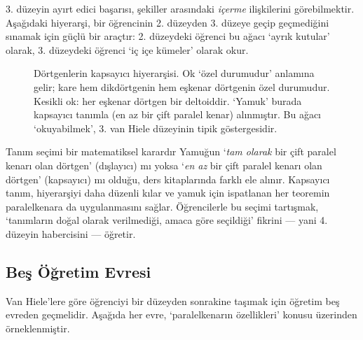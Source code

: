 3. düzeyin ayırt edici başarısı, şekiller arasındaki \emph{içerme} ilişkilerini görebilmektir. Aşağıdaki hiyerarşi, bir öğrencinin 2. düzeyden 3. düzeye geçip geçmediğini sınamak için güçlü bir araçtır: 2. düzeydeki öğrenci bu ağacı ‘ayrık kutular’ olarak, 3. düzeydeki öğrenci ‘iç içe kümeler’ olarak okur.

\begin{figure}[h]
\centering
{}
\caption{Dörtgenlerin kapsayıcı hiyerarşisi. Ok ‘özel durumudur’ anlamına gelir; kare hem dikdörtgenin hem eşkenar dörtgenin özel durumudur. Kesikli ok: her eşkenar dörtgen bir deltoiddir. ‘Yamuk’ burada kapsayıcı tanımla (en az bir çift paralel kenar) alınmıştır. Bu ağacı ‘okuyabilmek’, 3. van Hiele düzeyinin tipik göstergesidir.}\label{fig:dortgen}
\end{figure}

\begin{tbox}{Tanım seçimi bir matematiksel karardır}
Yamuğun ‘\emph{tam olarak} bir çift paralel kenarı olan dörtgen’ (dışlayıcı) mı yoksa ‘\emph{en az} bir çift paralel kenarı olan dörtgen’ (kapsayıcı) mı olduğu, ders kitaplarında farklı ele alınır. Kapsayıcı tanım, hiyerarşiyi daha düzenli kılar ve yamuk için ispatlanan her teoremin paralelkenara da uygulanmasını sağlar. Öğrencilerle bu seçimi tartışmak, ‘tanımların doğal olarak verilmediği, amaca göre seçildiği’ fikrini — yani 4. düzeyin habercisini — öğretir.
\end{tbox}

\subsection{Beş Öğretim Evresi}

Van Hiele’lere göre öğrenciyi bir düzeyden sonrakine taşımak için öğretim beş evreden geçmelidir. Aşağıda her evre, ‘paralelkenarın özellikleri’ konusu üzerinden örneklenmiştir.

